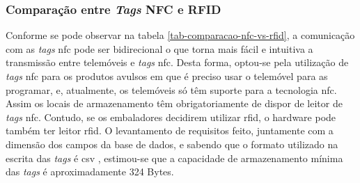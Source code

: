 \subsubsection{Comparação entre \textit{Tags} NFC e RFID}
\begin{table}[H]
	\centering
	\caption{Comparação da tecnologia \acrshort{nfc} com a tecnologia \acrshort{rfid}}\vspace{2mm}
	\label{tab-comparacao-nfc-vs-rfid}
\end{table}

Conforme se pode observar na tabela \ref{tab-comparacao-nfc-vs-rfid}, a comunicação com as \textit{tags} \acrshort{nfc} pode ser bidirecional o que torna mais fácil e intuitiva a transmissão entre telemóveis e \textit{tags} \acrshort{nfc}. Desta forma, optou-se pela utilização de \textit{tags} \acrshort{nfc} para os produtos avulsos em que é preciso usar o telemóvel para as programar, e, atualmente, os telemóveis só têm suporte para a tecnologia \acrshort{nfc}. Assim os locais de armazenamento têm obrigatoriamente de dispor de leitor de \textit{tags} \acrshort{nfc}. Contudo, se os embaladores decidirem utilizar \acrshort{rfid}, o hardware pode também ter leitor \acrshort{rfid}. O levantamento de requisitos feito, juntamente com a dimensão dos campos da base de dados, e sabendo que o formato utilizado na escrita das \textit{tags} é \acrlong{csv} \cite{RFC4180:csv}, estimou-se que a capacidade de armazenamento mínima das \textit{tags} é aproximadamente 324 Bytes.

